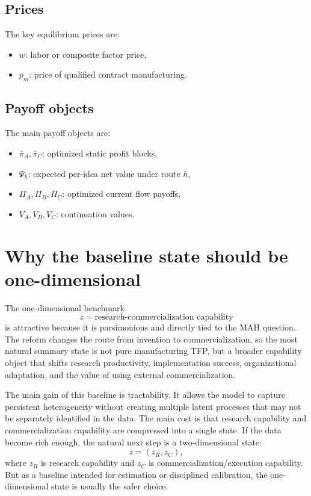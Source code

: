 \documentclass[12pt,fontset=none]{ctexart}
\begin{document}
\subsection{Prices}

The key equilibrium prices are:
\begin{itemize}[leftmargin=2em]
    \item $w$: labor or composite factor price,
    \item $p_m$: price of qualified contract manufacturing.
\end{itemize}

\subsection{Payoff objects}

The main payoff objects are:
\begin{itemize}[leftmargin=2em]
    \item $\bar{\pi}_A,\bar{\pi}_C$: optimized static profit blocks,
    \item $\Psi_h$: expected per-idea net value under route $h$,
    \item $\Pi_A,\Pi_B,\Pi_C$: optimized current flow payoffs,
    \item $V_A,V_B,V_C$: continuation values.
\end{itemize}

\section{Why the baseline state should be one-dimensional}

The one-dimensional benchmark
\[
z=\text{research-commercialization capability}
\]
is attractive because it is parsimonious and directly tied to the MAH question.
The reform changes the route from invention to commercialization, so the most natural
summary state is not pure manufacturing TFP, but a broader capability object that
shifts research productivity, implementation success, organizational adaptation, and
the value of using external commercialization.

The main gain of this baseline is tractability. It allows the model to capture persistent
heterogeneity without creating multiple latent processes that may not be separately
identified in the data. The main cost is that research capability and commercialization
capability are compressed into a single state. If the data become rich enough, the natural
next step is a two-dimensional state:
\[
z=(z_R,z_C),
\]
where $z_R$ is research capability and $z_C$ is commercialization/execution capability.
But as a baseline intended for estimation or disciplined calibration, the one-dimensional
state is usually the safer choice.
\end{document}
